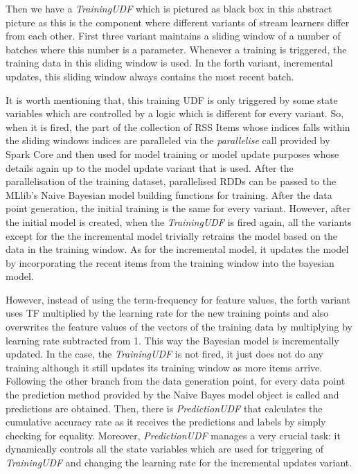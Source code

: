 \documentclass{article} %
\begin{document}
Then we have a \textit{TrainingUDF} which is pictured as black box in this abstract picture as this is the component where different variants of stream learners differ from each other. First three variant maintains a sliding window of a number of batches where this number is a parameter. Whenever a training is triggered, the training data in this sliding window is used. In the forth variant, incremental updates, this sliding window always contains the most recent batch. 

It is worth mentioning that, this training UDF is only triggered by some state variables which are controlled by a logic which is different for every variant. So, when it is fired, the part of the collection of RSS Items whose indices falls within the sliding windows indices are paralleled via the \textit{parallelise} call provided by Spark Core and then used for model training or model update purposes whose details again up to the model update variant that is used. After the parallelisation of the training dataset, parallelised RDDs can be passed to the MLlib's Naive Bayesian model building functions for training. After the data point generation, the initial training is the same for every variant. However, after the initial model is created, when the \textit{TrainingUDF} is fired again, all the variants except for the the incremental model trivially retrains the model based on the data in the training window. As for the incremental model, it updates the model by incorporating the recent items  from the training window into the bayesian model. 

However, instead of using the term-frequency for feature values, the forth variant uses TF multiplied by the learning rate for the new training points and also overwrites the feature values of the vectors of the training data by multiplying by learning rate subtracted from 1. This way the Bayesian model is incrementally updated. In the case, the \textit{TrainingUDF} is not fired, it just does not do any training although it still updates its training window as more items arrive. Following the other branch from the data generation point, for every data point the prediction method provided by the Naive Bayes model object is called and predictions are obtained. Then, there is \textit{PredictionUDF} that calculates the cumulative accuracy rate as it receives the predictions and labels by simply checking for equality. Moreover, \textit{PredictionUDF} manages a very crucial task: it dynamically controls all the state variables which are used for triggering of \textit{TrainingUDF} and changing the learning rate for the incremental updates variant.
\end{document}

